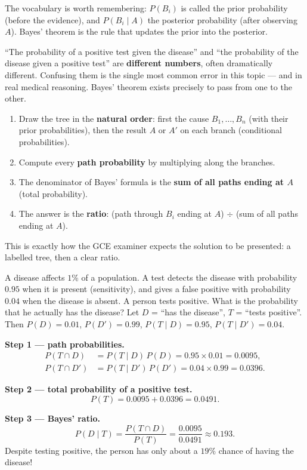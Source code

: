 \documentclass[11pt]{article}
\newcommand{\cle}[1]{{\popxbold\color{popdark}#1}}
\newcounter{popsec}
\newcounter{popsub}
\newcommand{\courssub}[1]{%
  \stepcounter{popsub}%
  \par\vspace{9pt}\noindent{\popxbold\fontsize{11.5}{13}\selectfont\color{popink}{\color{poporange}\thepopsec.\thepopsub}\hspace{6pt}#1}\par\nopagebreak\vspace{4pt}
}
\begin{document}
The vocabulary is worth remembering: $P(B_i)$ is called the \cle{prior} probability (before the evidence), and $P(B_i\mid A)$ the \cle{posterior} probability (after observing $A$). Bayes' theorem is the rule that updates the prior into the posterior.

\begin{attention}
``The probability of a positive test given the disease'' and ``the probability of the disease given a positive test'' are \textbf{different numbers}, often dramatically different. Confusing them is the single most common error in this topic — and in real medical reasoning. Bayes' theorem exists precisely to pass from one to the other.
\end{attention}

\begin{methode}
\begin{enumerate}
\item Draw the tree in the \textbf{natural order}: first the cause $B_1, \dots, B_n$ (with their prior probabilities), then the result $A$ or $A'$ on each branch (conditional probabilities).
\item Compute every \textbf{path probability} by multiplying along the branches.
\item The denominator of Bayes' formula is the \textbf{sum of all paths ending at $A$} (total probability).
\item The answer is the \textbf{ratio}: (path through $B_i$ ending at $A$) $\div$ (sum of all paths ending at $A$).
\end{enumerate}
This is exactly how the GCE examiner expects the solution to be presented: a labelled tree, then a clear ratio.
\end{methode}

\courssub{Application 1: Medical Testing}

\begin{exoresolu}
A disease affects $1\%$ of a population. A test detects the disease with probability $0.95$ when it is present (\cle{sensitivity}), and gives a false positive with probability $0.04$ when the disease is absent. A person tests positive. What is the probability that he actually has the disease?
\tcblower
Let $D$ = ``has the disease'', $T$ = ``tests positive''. Then $P(D) = 0.01$, $P(D') = 0.99$, $P(T\mid D) = 0.95$, $P(T\mid D') = 0.04$.

\textbf{Step 1 — path probabilities.}
\begin{align*}
P(T\cap D) &= P(T\mid D)\,P(D) = 0.95 \times 0.01 = 0.0095,\\
P(T\cap D') &= P(T\mid D')\,P(D') = 0.04 \times 0.99 = 0.0396.
\end{align*}

\textbf{Step 2 — total probability of a positive test.}
\[ P(T) = 0.0095 + 0.0396 = 0.0491. \]

\textbf{Step 3 — Bayes' ratio.}
\[ P(D\mid T) = \frac{P(T\cap D)}{P(T)} = \frac{0.0095}{0.0491} \approx 0.193. \]
Despite testing positive, the person has only about a $19\%$ chance of having the disease!
\end{exoresolu}
\end{document}
